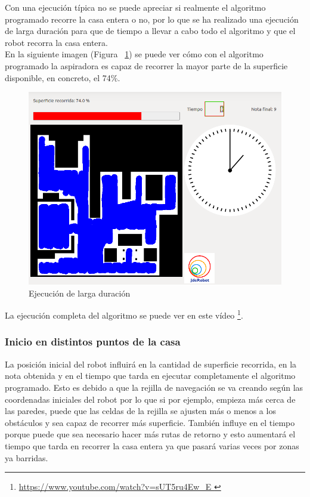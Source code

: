 Con una ejecución típica no se puede apreciar si realmente el algoritmo programado recorre la casa entera o no, por lo que se ha realizado una ejecución de larga duración para que de tiempo a llevar a cabo todo el algoritmo y que el robot recorra la casa entera.\\ 

En la siguiente imagen (Figura ~\ref{fig.sala}) se puede ver cómo con el algoritmo programado la aspiradora es capaz de recorrer la mayor parte de la superficie disponible, en concreto, el 74\%.

\begin{figure}[H]
  \begin{center}
    \includegraphics[width=1.0\textwidth]{figures/Vacuum/refereeSala.png}
		\caption{Ejecución de larga duración}
		\label{fig.sala}
		\end{center}
\end{figure}

La ejecución completa del algoritmo se puede ver en este vídeo \footnote{\url{https://www.youtube.com/watch?v=sUT5ru4Ew_E
}}.

\subsubsection{Inicio en distintos puntos de la casa}

La posición inicial del robot influirá en la cantidad de superficie recorrida, en la nota obtenida y en el tiempo que tarda en ejecutar completamente el algoritmo programado. Esto es debido a que la rejilla de navegación se va creando según las coordenadas iniciales del robot por lo que si por ejemplo, empieza más cerca de las paredes, puede que las celdas de la rejilla se ajusten más o menos a los obstáculos y sea capaz de recorrer más superficie. También influye en el tiempo porque puede que sea necesario hacer más rutas de retorno y esto aumentará el tiempo que tarda en recorrer la casa entera ya que pasará varias veces por zonas ya barridas.\\

